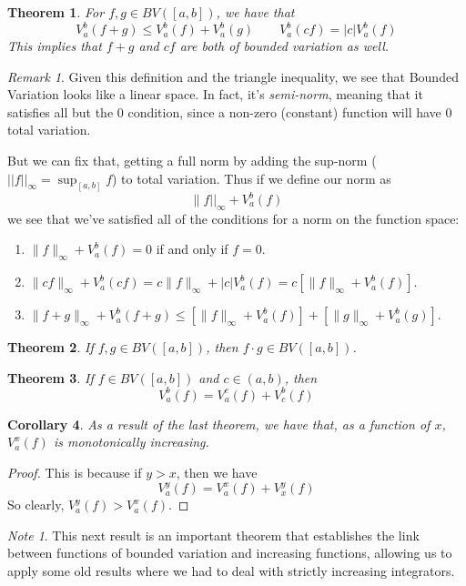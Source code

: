 \documentclass[12pt]{article}
\theoremstyle{plain}
\newtheorem{thm}{Theorem}[subsection]
\newtheorem{cor}[thm]{Corollary}
\theoremstyle{definition}
\theoremstyle{remark}
\newtheorem*{rmk}{Remark}
\newtheorem*{note}{Note}
\begin{document}
\begin{thm}
For $f, g\in BV([a,b])$, we have that
    \[ V_a^b(f+g) \leq V_a^b(f) + V_a^b(g)
    \qquad V_a^b(cf) = |c|V_a^b(f) \]
This implies that $f+g$ and $cf$ are both of bounded variation as well.
\end{thm}
\begin{rmk}
Given this definition and the triangle inequality, we see that Bounded Variation looks like a linear space. In fact, it's \emph{semi-norm}, meaning that it satisfies all but the 0 condition, since a non-zero (constant) function will have 0 total variation. 

But we can fix that, getting a full norm by adding the sup-norm ($||f||_\infty = \sup_{[a,b]} f$) to total variation. Thus if we define our norm as
    \[ \lVert f||_\infty + V_a^b(f) \]
we see that we've satisfied all of the conditions for a norm on the function space:
\begin{enumerate}
    \item $\lVert f\rVert_\infty + V_a^b(f) = 0$ if and only if $f=0$.
    \item $\lVert cf\rVert_\infty + V_a^b(cf) = c\lVert f\rVert_\infty + |c|V_a^b(f)
        = c\left[\lVert f\rVert_\infty + V_a^b(f)\right]$.
    \item $\lVert f+g\rVert_\infty + V_a^b(f+g) \leq 
        \left[\lVert f\rVert_\infty + V_a^b(f)\right] +
        \left[\lVert g\rVert_\infty + V_a^b(g)\right]$.
\end{enumerate}
\end{rmk}

\begin{thm}
If $f,g\in BV([a,b])$, then $f\cdot g \in BV([a,b])$.
\end{thm}

\begin{thm}
If $f\in BV([a,b])$ and $c \in (a,b)$, then 
    \[ V_a^b(f) = V_a^c(f) + V_c^b(f) \]
\end{thm}
\begin{cor}
As a result of the last theorem, we have that, as a function of $x$, $V_a^x(f)$ is monotonically increasing.
\end{cor}
\begin{proof}
This is because if $y>x$, then we have 
    \[ V_a^y(f) = V_a^x(f) + V_x^y(f) \]
So clearly, $V_a^y(f) >V_a^x(f)$.
\end{proof}

\begin{note}
This next result is an important theorem that establishes the link between functions of bounded variation and increasing functions, allowing us to apply some old results where we had to deal with strictly increasing integrators.
\end{note}
\end{document}
